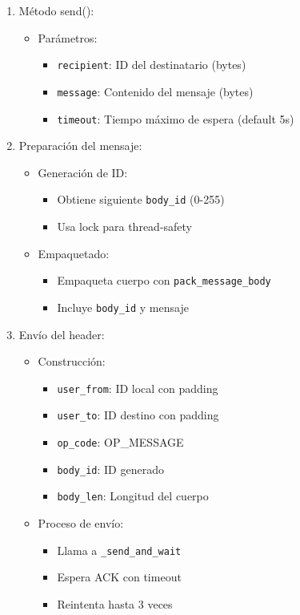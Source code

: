 \documentclass[12pt]{article}
\begin{document}
\begin{enumerate}
    \item Método send():
    \begin{itemize}
        \item Parámetros:
        \begin{itemize}
            \item \texttt{recipient}: ID del destinatario (bytes)
            \item \texttt{message}: Contenido del mensaje (bytes)
            \item \texttt{timeout}: Tiempo máximo de espera (default 5s)
        \end{itemize}
    \end{itemize}

    \item Preparación del mensaje:
    \begin{itemize}
        \item Generación de ID:
        \begin{itemize}
            \item Obtiene siguiente \texttt{body\_id} (0-255)
            \item Usa lock para thread-safety
        \end{itemize}
        \item Empaquetado:
        \begin{itemize}
            \item Empaqueta cuerpo con \texttt{pack\_message\_body}
            \item Incluye \texttt{body\_id} y mensaje
        \end{itemize}
    \end{itemize}

    \item Envío del header:
    \begin{itemize}
        \item Construcción:
        \begin{itemize}
            \item \texttt{user\_from}: ID local con padding
            \item \texttt{user\_to}: ID destino con padding
            \item \texttt{op\_code}: OP\_MESSAGE
            \item \texttt{body\_id}: ID generado
            \item \texttt{body\_len}: Longitud del cuerpo
        \end{itemize}
        \item Proceso de envío:
        \begin{itemize}
            \item Llama a \texttt{\_send\_and\_wait}
            \item Espera ACK con timeout
            \item Reintenta hasta 3 veces
        \end{itemize}
    \end{itemize}


\end{enumerate}
\end{document}
